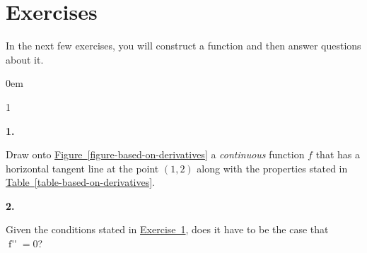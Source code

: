 \documentclass[12pt,]{book}
\theoremstyle{plain}
\theoremstyle{definition}
\newcommand{\hrulemedium}{\noalign{\hrule height 0.07em}}
\newcommand{\hrulethick} {\noalign{\hrule height 0.11em}}
\newcounter{figstack}
\newcounter{figindex}
\newlength\fight
\newcommand\pushValignCaptionBottom[5][b]{%
\stepcounter{figstack}%
\expandafter\def\csname %
figalign\romannumeral\value{figstack}\endcsname{#1}%
\expandafter\def\csname %
figtype\romannumeral\value{figstack}\endcsname{#2}%
\expandafter\def\csname %
figwd\romannumeral\value{figstack}\endcsname{#3}%
\expandafter\def\csname %
figcontent\romannumeral\value{figstack}\endcsname{#4}%
\expandafter\def\csname %
figcap\romannumeral\value{figstack}\endcsname{#5}%
\setbox0=\hbox{%
\begin{#2}{#3}#4\end{#2}}%
\ifdim\dimexpr\ht0+\dp0\relax>\fight\global\setlength{\fight}{%
\dimexpr\ht0+\dp0\relax}\fi%
}
\newcommand\popValignCaptionBottom{%
\setcounter{figindex}{0}%
\hfill%
\whiledo{\value{figindex}<\value{figstack}}{%
\stepcounter{figindex}%
\def\tmp{\csname figwd\romannumeral\value{figindex}\endcsname}%
\begin{\csname figtype\romannumeral\value{figindex}\endcsname}[t]{\tmp}%
\centering%
\stackinset{c}{}%
{\csname figalign\romannumeral\value{figindex}\endcsname}{}%
{\csname figcontent\romannumeral\value{figindex}\endcsname}%
{\rule{0pt}{\fight}}\par%
\csname figcap\romannumeral\value{figindex}\endcsname%
\end{\csname figtype\romannumeral\value{figindex}\endcsname}%
\hfill%
}%
\setcounter{figstack}{0}%
\setlength{\fight}{0pt}%
\hfill%
}
\newenvironment{exercisegroup}%
{\medskip\noindent}%
{\par\bigskip}%
\newlength{\exercisegroupindent}%
\newlength{\exercisegroupitemwidth}%
\newenvironment{exercisegrouplist}%
{\vspace{-\partopsep}%
\begin{adjustwidth}{\exercisegroupindent}{0em}}%
{\end{adjustwidth}%
\vspace{-\partopsep}%
\vspace{\baselineskip}}%
\newenvironment{exercisegroupbycol}[1]%
{\begin{exercisegrouplist}%
\vspace{-\multicolsep}%
\begin{multicols}{#1}%
\setlength{\parindent}{0em}%
\setlength{\exercisegroupitemwidth}{\linewidth}}%
{\end{multicols}%
\vspace{-\multicolsep}%
\end{exercisegrouplist}}%
\newenvironment{exercisegroupitem}[1]%
{\begin{minipage}[t]{\exercisegroupitemwidth}
\vspace{0pt}%
{\bfseries#1}%
\rule{0pt}{\baselineskip}}{\strut%
\end{minipage}%
\hspace{\columnsep}}%
\providecommand\phantomsection{}
\newcommand{\fe}[2]{\mathop{{#1}{\left(#2\right)}}}
\newcommand{\ointerval}[2]{\left(#1,#2\right)}
\newcommand{\point}[2]{\left(#1,#2\right)}
\newcommand{\fd}[1]{#1'}
\newcommand{\sd}[1]{#1''}
\begin{document}
\section*{Exercises}\label{exercises-1}

\begin{exercisegroup}%
In the next few exercises, you will construct a function and then answer questions about it.%
\par
\begin{exercisegroupbycol}{1}%
\begin{exercisegroupitem}{1. }\phantomsection\hypertarget{exercise-based-on-derivatives}{\null}
Draw onto \hyperref[figure-based-on-derivatives]{Figure~\ref*{figure-based-on-derivatives}} a \emph{continuous} function \(f\) that has a horizontal tangent line at the point \(\point{1}{2}\) along with the properties stated in \hyperref[table-based-on-derivatives]{Table~\ref*{table-based-on-derivatives}}.%
\end{exercisegroupitem}%
\par%
\begin{exercisegroupitem}{2. }\phantomsection\hypertarget{exercise-2}{\null}
Given the conditions stated in \hyperref[exercise-based-on-derivatives]{Exercise~1}, does it have to be the case that \(\fe{\sd{f}}{-1}=0\)?%
\end{exercisegroupitem}%

\end{exercisegroupbycol}
\end{exercisegroup}
\end{document}
